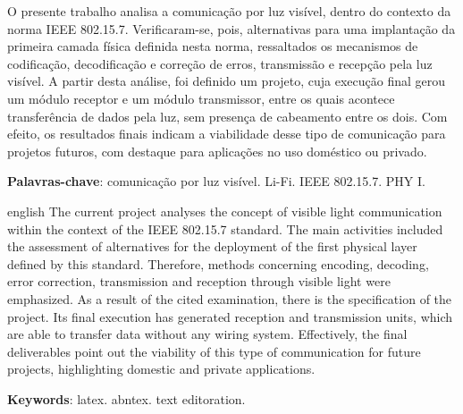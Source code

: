 
\setlength{\absparsep}{18pt} %
\begin{resumo}
	O presente trabalho analisa a comunicação por luz visível, dentro do contexto da norma IEEE 802.15.7. Verificaram-se, pois, alternativas para uma implantação da primeira camada física definida nesta norma, ressaltados os mecanismos de codificação, decodificação e correção de erros, transmissão e recepção pela luz visível. A partir desta análise, foi definido um projeto, cuja execução final gerou um módulo receptor e um módulo transmissor, entre os quais acontece transferência de dados pela luz, sem presença de cabeamento entre os dois. Com efeito, os resultados finais indicam a viabilidade desse tipo de comunicação para projetos futuros, com destaque para aplicações no uso doméstico ou privado. 
	
	\textbf{Palavras-chave}: comunicação por luz visível. Li-Fi. IEEE 802.15.7. PHY I.
\end{resumo}

\begin{resumo}[Abstract]
	\begin{otherlanguage*}{english}
		The current project analyses the concept of visible light communication within the context of the IEEE 802.15.7 standard. The main activities included the assessment of alternatives for the deployment of the first physical layer defined by this standard. Therefore, methods concerning encoding, decoding, error correction, transmission and reception through visible light were emphasized. As a result of the cited examination, there is the specification of the project. Its final execution has generated reception and transmission units, which are able to transfer data without any wiring system. Effectively, the final deliverables point out the viability of this type of communication for future projects, highlighting domestic and private applications.
		
		\vspace{\onelineskip}
		
		\noindent 
		\textbf{Keywords}: latex. abntex. text editoration.
	\end{otherlanguage*}
\end{resumo}